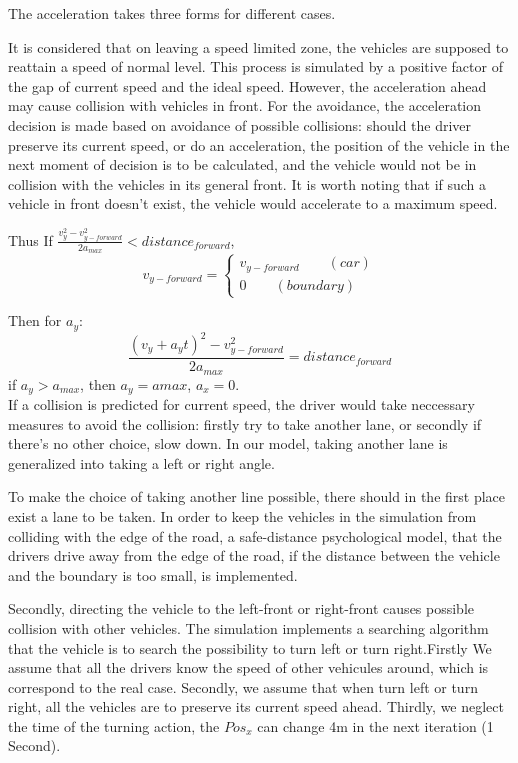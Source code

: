 \documentclass{mcmthesis}
\begin{document}
The acceleration takes three forms for different cases.

It is considered that on leaving a speed limited zone, the vehicles are supposed to reattain a speed of normal level. This process is simulated by a positive factor of the gap of current speed and the ideal speed. However, the acceleration ahead may cause collision with vehicles in front. For the avoidance, the acceleration decision is made based on avoidance of possible collisions: should the driver preserve its current speed, or do an acceleration, the position of the vehicle in the next moment of decision is to be calculated, and the vehicle would not be in collision with the vehicles in its general front. It is worth noting that if such a vehicle in front doesn't exist, the vehicle would accelerate to a maximum speed.

Thus %
If $\frac{v_y^2-v_{y-forward}^2}{2a_{max}}<distance_{forward}$,
$$v_{y-forward}= \left\{ 
\begin{aligned}
v_{y-forward} \qquad (car)\\
0 \qquad (boundary)
\end{aligned}
\right.
$$

Then for $a_y$:
$$\frac{(v_y+a_yt)^2-v_{y-forward}^2}{2a_{max}}=distance_{forward}$$
if $a_y>a_{max}$, then $a_y=a{max}$, $a_x=0$.\\

If a collision is predicted for current speed, the driver would take neccessary measures to avoid the collision: firstly try to take another lane, or secondly if there's no other choice, slow down. In our model, taking another lane is generalized into taking a left or right angle.

To make the choice of taking another line possible, there should in the first place exist a lane to be taken. In order to keep the vehicles in the simulation from colliding with the edge of the road, a safe-distance psychological model, that the drivers drive away from the edge of the road, if the distance between the vehicle and the boundary is too small, is implemented. 

Secondly, directing the vehicle to the left-front or right-front causes possible collision with other vehicles. The simulation implements a searching algorithm that the vehicle is to search the possibility to turn left or turn right.Firstly We assume that all the drivers know the speed of other vehicules around, which is correspond to the real case. Secondly, we assume that when turn left or turn right, all the vehicles are to preserve its current speed ahead. Thirdly, we neglect the time of the turning action, the $Pos_x$ can change 4m in the next iteration \quad(1 Second).
\end{document}
